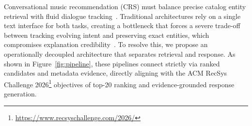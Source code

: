 
Conversational music recommendation (CRS) must balance precise catalog entity retrieval with fluid dialogue tracking~\cite{melchiorre2025jam,kemper2024rarec}. Traditional architectures rely on a single text interface for both tasks, creating a bottleneck that forces a severe trade-off between tracking evolving intent and preserving exact entities, which compromises explanation credibility~\cite{qin2024credible}. To resolve this, we propose an operationally decoupled architecture that separates retrieval and response. As shown in Figure~\ref{fig:pipeline}, these pipelines connect strictly via ranked candidates and metadata evidence, directly aligning with the ACM RecSys Challenge 2026\footnote{\url{https://www.recsyschallenge.com/2026/}} objectives of top-20 ranking and evidence-grounded response generation.

